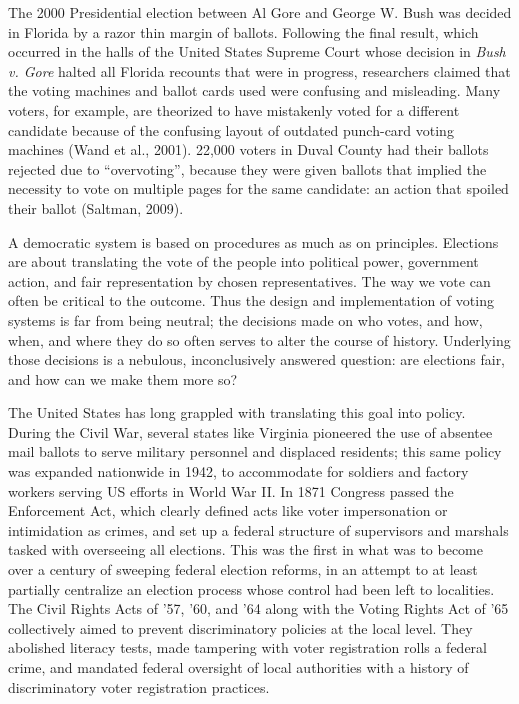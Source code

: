 \documentclass[12pt,twoside]{reedthesis}
\begin{document}
  The 2000 Presidential election between Al Gore and George W. Bush was
  decided in Florida by a razor thin margin of ballots. Following the
  final result, which occurred in the halls of the United States Supreme
  Court whose decision in \emph{Bush v. Gore} halted all Florida recounts
  that were in progress, researchers claimed that the voting machines and
  ballot cards used were confusing and misleading. Many voters, for
  example, are theorized to have mistakenly voted for a different
  candidate because of the confusing layout of outdated punch-card voting
  machines (Wand et al., 2001). 22,000 voters in Duval County had their
  ballots rejected due to ``overvoting'', because they were given ballots
  that implied the necessity to vote on multiple pages for the same
  candidate: an action that spoiled their ballot (Saltman, 2009).
  
  A democratic system is based on procedures as much as on principles.
  Elections are about translating the vote of the people into political
  power, government action, and fair representation by chosen
  representatives. The way we vote can often be critical to the outcome.
  Thus the design and implementation of voting systems is far from being
  neutral; the decisions made on who votes, and how, when, and where they
  do so often serves to alter the course of history. Underlying those
  decisions is a nebulous, inconclusively answered question: are elections
  fair, and how can we make them more so?
  
  The United States has long grappled with translating this goal into
  policy. During the Civil War, several states like Virginia pioneered the
  use of absentee mail ballots to serve military personnel and displaced
  residents; this same policy was expanded nationwide in 1942, to
  accommodate for soldiers and factory workers serving US efforts in World
  War II. In 1871 Congress passed the Enforcement Act, which clearly
  defined acts like voter impersonation or intimidation as crimes, and set
  up a federal structure of supervisors and marshals tasked with
  overseeing all elections. This was the first in what was to become over
  a century of sweeping federal election reforms, in an attempt to at
  least partially centralize an election process whose control had been
  left to localities. The Civil Rights Acts of '57, '60, and '64 along
  with the Voting Rights Act of '65 collectively aimed to prevent
  discriminatory policies at the local level. They abolished literacy
  tests, made tampering with voter registration rolls a federal crime, and
  mandated federal oversight of local authorities with a history of
  discriminatory voter registration practices.
  
\end{document}
